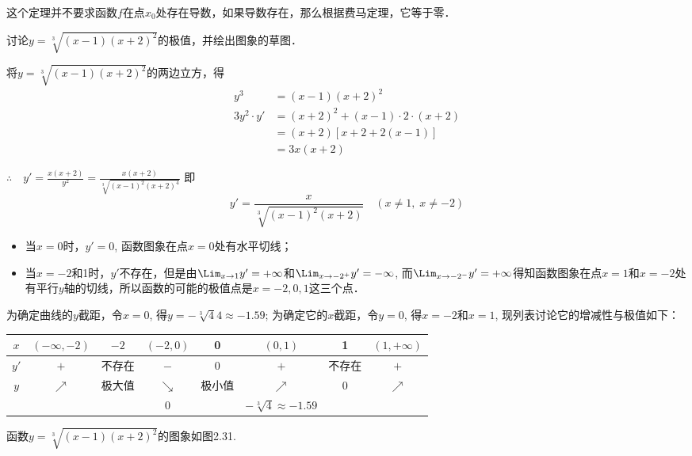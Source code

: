 \begin{rmk}
    这个定理并不要求函数$f$在点$x_0$处存在导数，如果导数存在，那么根据费马定理，它等于零．
\end{rmk}


\begin{example}
    讨论$y=\sqrt[3]{(x-1)(x+2)^2}$的极值，并绘出图象的草图．
\end{example}

\begin{solution}
将$y=\sqrt[3]{(x-1)(x+2)^2}$的两边立方，得
\begin{align*}
    y^3&= (x-1) (x+2)^2\\
    3y^2\cdot y'&= (x+2)^2+ (x-1)\cdot 2\cdot  (x+2)\\
    &= (x+2) [x+2+2(x-1)]\\
    &=3x (x+2) 
\end{align*}

$\therefore\quad 
y'=\frac{x (x+2)}{y^2}=\frac{x (x+2)}{\sqrt[3]{(x-1)^2(x+2)^4}}$
即
\[y'=\frac{x}{\sqrt[3]{(x-1)^2(x+2)}}\quad 
(x\ne 1,\; x\ne -2)\]
\begin{itemize}
    \item 当$x=0$时，$y'=0$, 函数图象在点$x=0$处有水平切线；
    \item 当$x=-2$和1时，$y'$不存在，但是由$\Lim_{x\to 1}y'=+\infty$和$\Lim_{x\to -2^+}y'=-\infty$, 而$\Lim_{x\to -2^-}y'=+\infty$得知函数图象在点$x=1$和$x=-2$处有平行$y$轴的切线，所以函数的可能的极值点是$x=-2, 0, 1$这三个点．
\end{itemize}

为确定曲线的$y$截距，令$x=0$, 得$y=-\sqrt[3]{4}4\approx -1.59$; 为确定它的$x$截距，令$y=0$, 得$x=-2$和$x=1$, 现列表讨论它的增减性与极值如下：
\begin{center}
\begin{tabular}{c|ccccccc}
\hline
$x$ &$(-\infty,-2)$ & $-2$ & $(-2,0)$ & 0&$(0,1)$& 1& $(1,+\infty)$\\
\hline
$y'$ & $+$ & 不存在 & $-$ &0&$+$&不存在&$+$\\
$y$ & $\nearrow$ &极大值&$\searrow$ &极小值&$\nearrow$ &0&$\nearrow$\\ 
&&&0&&$-\sqrt[3]{4}\approx -1.59$\\
\hline
\end{tabular}
\end{center}

函数$y=\sqrt[3]{(x-1)(x+2)^2}$的图象如图2.31.
\begin{figure}[htp]
    \centering
{}
\end{figure}
\end{solution}

